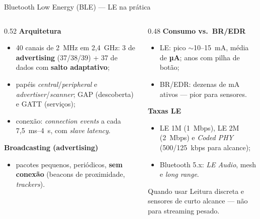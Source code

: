 \documentclass[aspectratio=169,11pt]{beamer}
\begin{document}
\begin{frame}{Bluetooth Low Energy (BLE) --- LE na prática}
  \small
  \begin{columns}
    \begin{column}{0.52\textwidth}
      \textbf{Arquitetura}
      \begin{itemize}
        \item 40 canais de 2~MHz em 2,4~GHz: 3 de \textbf{advertising} (37/38/39) + 37 de dados com \textbf{salto adaptativo};
        \item papéis \emph{central}/\emph{peripheral} e \emph{advertiser}/\emph{scanner}; GAP (descoberta) e GATT (serviços);
        \item conexão: \emph{connection events} a cada 7,5~ms--4~s, com \emph{slave latency}.
      \end{itemize}
      \textbf{Broadcasting (advertising)}
      \begin{itemize}
        \item pacotes pequenos, periódicos, \textbf{sem conexão} (beacons de proximidade, \emph{trackers}).
      \end{itemize}
    \end{column}
    \begin{column}{0.48\textwidth}
      \textbf{Consumo vs.\ BR/EDR}
      \begin{itemize}
        \item LE: pico $\sim$10--15~mA, média de \textbf{µA}; anos com pilha de botão;
        \item BR/EDR: dezenas de mA ativos --- pior para sensores.
      \end{itemize}
      \textbf{Taxas LE}
      \begin{itemize}
        \item LE 1M (1~Mbps), LE 2M (2~Mbps) e \emph{Coded PHY} (500/125~kbps para alcance);
        \item Bluetooth 5.x: \emph{LE Audio}, mesh e \emph{long range}.
      \end{itemize}
      \begin{alertblock}{Quando usar}
        Leitura discreta e sensores de curto alcance --- não para streaming pesado.
      \end{alertblock}
    \end{column}
  \end{columns}
\end{frame}
\end{document}
